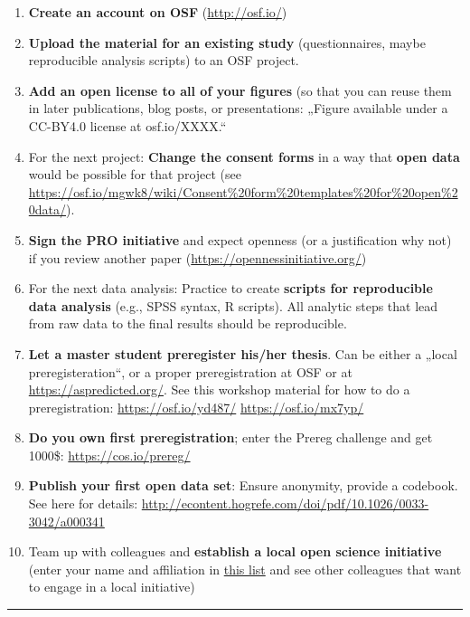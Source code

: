 \documentclass[12pt,]{report}
\providecommand{\tightlist}{%
  \setlength{\itemsep}{0pt}\setlength{\parskip}{0pt}}
\begin{document}
\begin{enumerate}
\def\labelenumi{\arabic{enumi}.}
\tightlist
\item
  \textbf{Create an account on OSF} (\url{http://osf.io/})
\item
  \textbf{Upload the material for an existing study} (questionnaires,
  maybe reproducible analysis scripts) to an OSF project.
\item
  \textbf{Add an open license to all of your figures} (so that you can
  reuse them in later publications, blog posts, or presentations:
  „Figure available under a CC-BY4.0 license at osf.io/XXXX.``
\item
  For the next project: \textbf{Change the consent forms} in a way that
  \textbf{open data} would be possible for that project (see
  \url{https://osf.io/mgwk8/wiki/Consent\%20form\%20templates\%20for\%20open\%20data/}).
\item
  \textbf{Sign the PRO initiative} and expect openness (or a
  justification why not) if you review another paper
  (\url{https://opennessinitiative.org/})
\item
  For the next data analysis: Practice to create \textbf{scripts for
  reproducible data analysis} (e.g., SPSS syntax, R scripts). All
  analytic steps that lead from raw data to the final results should be
  reproducible.
\item
  \textbf{Let a master student preregister his/her thesis}. Can be
  either a „local preregisteration``, or a proper preregistration at OSF
  or at \url{https://aspredicted.org/}. See this workshop material for
  how to do a preregistration: \url{https://osf.io/yd487/}
  \url{https://osf.io/mx7yp/}
\item
  \textbf{Do you own first preregistration}; enter the Prereg challenge
  and get 1000\$: \url{https://cos.io/prereg/}
\item
  \textbf{Publish your first open data set}: Ensure anonymity, provide a
  codebook. See here for details:
  \url{http://econtent.hogrefe.com/doi/pdf/10.1026/0033-3042/a000341}
\item
  Team up with colleagues and \textbf{establish a local open science
  initiative} (enter your name and affiliation in
  \href{https://osf.io/tbkzh/wiki/Wer\%20macht\%20bei\%20meiner\%20Uni\%20mit\%3F/}{this
  list} and see other colleagues that want to engage in a local
  initiative)
\end{enumerate}

\begin{center}\rule{0.5\linewidth}{\linethickness}\end{center}
\end{document}
